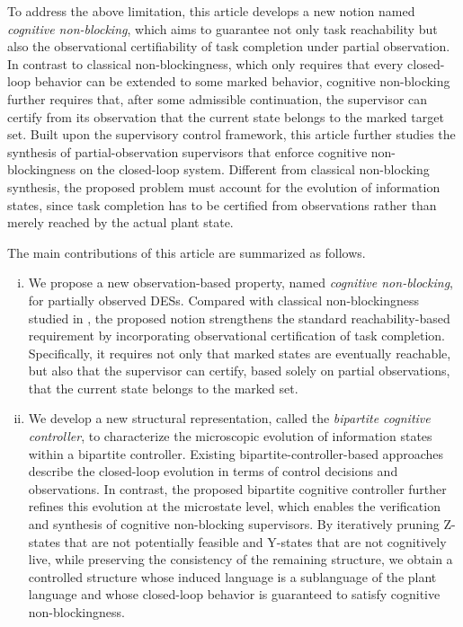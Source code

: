 \documentclass[journal,twoside,web]{ieeecolor}
\begin{document}
To address the above limitation, this article develops a new notion named \emph{cognitive non-blocking}, which aims to guarantee not only task reachability but also the observational certifiability of task completion under partial observation.
%
In contrast to classical non-blockingness, which only requires that every closed-loop behavior can be extended to some marked behavior, cognitive non-blocking further requires that, after some admissible continuation, the supervisor can certify from its observation that the current state belongs to the marked target set.
%
Built upon the supervisory control framework, this article further studies the synthesis of partial-observation supervisors that enforce cognitive non-blockingness on the closed-loop system.
Different from classical non-blocking synthesis, the proposed problem must account for the evolution of information states, since task completion has to be certified from observations rather than merely reached by the actual plant state.

The main contributions of this article are summarized as follows.
%
\begin{enumerate}[(i)]
    \item We propose a new observation-based property, named \emph{cognitive non-blocking}, for partially observed DESs.
    Compared with classical non-blockingness studied in  \cite{yin2016synthesis,yin2018synthesis}, the proposed notion strengthens the standard reachability-based requirement by incorporating observational certification of task completion.
    Specifically, it requires not only that marked states are eventually reachable, but also that the supervisor can certify, based solely on partial observations, that the current state belongs to the marked set.

    \item We develop a new structural representation, called the     \emph{bipartite cognitive controller}, to characterize the microscopic     evolution of information states within a bipartite controller.
    Existing bipartite-controller-based approaches      \cite{yin2016uniform,zheng2026enforcement} describe the closed-loop     evolution in terms of control decisions and observations.
    In contrast, the proposed bipartite cognitive controller further refines this evolution at the microstate level, which enables the verification and synthesis of cognitive non-blocking supervisors.
    By iteratively pruning Z-states that are not potentially feasible and Y-states that are not cognitively live, while preserving the consistency of the remaining structure, we obtain a controlled structure whose induced language is a sublanguage of the plant language and whose closed-loop behavior is guaranteed to satisfy cognitive non-blockingness.
    
\end{enumerate}
\end{document}
